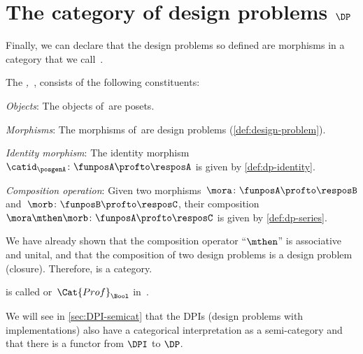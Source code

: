 

\section{The category of design problems $\DP$}

Finally, we can declare that the design problems so defined are morphisms 
in a category that we call~\iindex{\DP}.


\begin{definition}
    \label{def:DP}
    The \emph{,~\DP}, consists of the following constituents:
    \begin{compactenum}
        \item \emph{Objects}: The objects of~\DP are posets.
        \item \emph{Morphisms}: The morphisms of~\DP are design problems (\cref{def:design-problem}).
        \item \emph{Identity morphism}: The identity morphism~$\catid_\posgenA \colon \funposA \profto \resposA$ is given by \cref{def:dp-identity}.
        \item \emph{Composition operation}: Given two morphisms~$\mora \colon  \funposA \profto \resposB$ and~$\morb \colon \funposB \profto \resposC$, their
        composition~$\mora \mthen \morb\colon \funposA\profto \resposC$ is given by \cref{def:dp-series}.
    \end{compactenum}
\end{definition}

We have already shown that the composition operator ``$\mthen$'' is associative and unital, and that the composition of two design problems is a design problem (closure).
Therefore, \DP is a category.

\begin{remark}
    \DP is called \feas or~$\Cat{Prof}_\Bool$ in~\cite{fong2019}.
\end{remark}


\begin{remark}
    We will see in \cref{sec:DPI-semicat} that the DPIs (design problems with implementations) also have 
    a categorical interpretation as a semi-category \DPI and that there is a functor from $\DPI$ to $\DP$. 
\end{remark}
